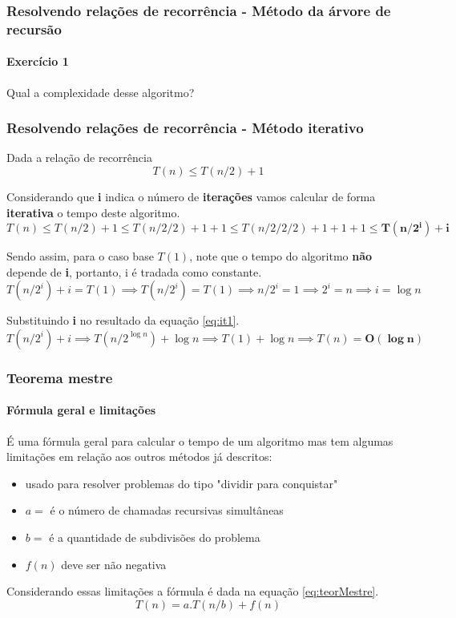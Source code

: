 \begin{frame}
	\frametitle{Resolvendo relações de recorrência - Método da árvore de recursão}
	\framesubtitle{Exercício 1}
	
	\par Qual a complexidade desse algoritmo?
\end{frame}

\begin{frame}
	\frametitle{Resolvendo relações de recorrência - Método iterativo}
	\par Dada a relação de recorrência
	\begin{equation}
		T(n) \leq T(n/2) + 1
	\end{equation}
	\par Considerando que \textbf{i} indica o número de \textbf{iterações} vamos calcular de forma \textbf{iterativa} o tempo deste algoritmo.
	\begin{equation}
		\label{eq:it1}
		T(n) \leq T(n/2) + 1 \leq T(n/2/2) + 1 + 1 \leq T(n/2/2/2) + 1 + 1 + 1 \leq \mathbf{T(n/2^i) + i} 
	\end{equation}
	\par Sendo assim, para o caso base $T(1)$, note que o tempo do algoritmo \textbf{não} depende de \textbf{i}, portanto, i é tradada como constante.
	\begin{equation}
		T(n/2^i) + i = T(1) \implies T(n/2^i) = T(1) \implies n/2^i = 1 \implies 2^i = n \implies i = \log n
	\end{equation}
	\par Substituindo \textbf{i} no resultado da equação \ref{eq:it1}.
	\begin{equation}
		T(n/2^i) + i \implies T(n/2^{\log n}) + \log n \implies T(1) + \log n \implies T(n) = \mathbf{O(\log n)}
	\end{equation}
	
\end{frame}

\begin{frame}
	\frametitle{Teorema mestre}
	\framesubtitle{Fórmula geral e limitações}
	\par É uma fórmula geral para calcular o tempo de um algoritmo mas tem algumas limitações em relação aos outros métodos já descritos:
	\begin{itemize}
		\item usado para resolver problemas do tipo "dividir para conquistar"
		\item $a =$ é o número de chamadas recursivas simultâneas
		\item $b =$ é a quantidade de subdivisões do problema
		\item $f(n)$ deve ser não negativa
	\end{itemize}
	\par Considerando essas limitações a fórmula é dada na equação \ref{eq:teorMestre}.
	\begin{equation}
		\label{eq:teorMestre}
		T(n) = a.T(n/b) + f(n)
	\end{equation}
\end{frame}


